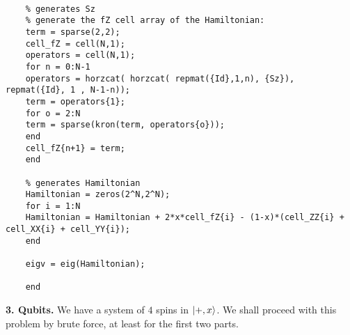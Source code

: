 \documentclass{article}
\theoremstyle{definition}
\begin{document}
\begin{enumerate}[label=(\alph*)]
\begin{lstlisting}
	
	% generates Sz
	% generate the fZ cell array of the Hamiltonian:
	term = sparse(2,2);
	cell_fZ = cell(N,1);
	operators = cell(N,1);
	for n = 0:N-1
	operators = horzcat( horzcat( repmat({Id},1,n), {Sz}), repmat({Id}, 1 , N-1-n));
	term = operators{1};
	for o = 2:N 
	term = sparse(kron(term, operators{o}));
	end
	cell_fZ{n+1} = term;
	end
	
	% generates Hamiltonian
	Hamiltonian = zeros(2^N,2^N);
	for i = 1:N
	Hamiltonian = Hamiltonian + 2*x*cell_fZ{i} - (1-x)*(cell_ZZ{i} + cell_XX{i} + cell_YY{i});
	end
	
	eigv = eig(Hamiltonian);
	
	end

	\end{lstlisting}
\end{enumerate}






\noindent \textbf{3. Qubits.} We have a system of $4$ spins in $\ket{+,x}$. We shall proceed with this problem by brute force, at least for the first two parts. 
\end{document}
